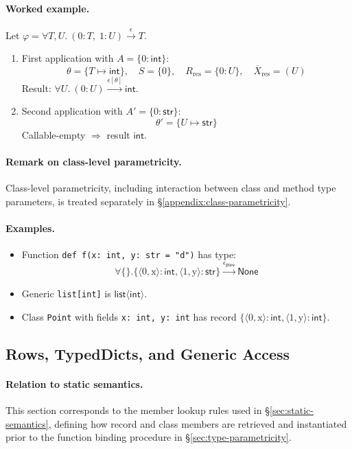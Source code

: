 \paragraph{Worked example.}
Let $\varphi = \forall T,U.~(0:T,\;1:U) \xrightarrow{\epsilon} T$.
\begin{enumerate}
  \item First application with $A=\{0:\mathsf{int}\}$:
  \[
    \theta=\{T\mapsto \mathsf{int}\},\quad S=\{0\},\quad
    R_{\mathrm{res}} = \{0:U\},\quad
    \overline{X}_{\mathrm{res}}=(U)
  \]
  Result: $\forall U.~(0:U)\xrightarrow{\epsilon[\theta]} \mathsf{int}$.
  \item Second application with $A'=\{0:\mathsf{str}\}$:
  \[
    \theta'=\{U\mapsto \mathsf{str}\}
  \]
  Callable-empty $\Rightarrow$ result $\mathsf{int}$.
\end{enumerate}

\paragraph{Remark on class-level parametricity.}
Class-level parametricity, including interaction between class and method type parameters,
is treated separately in \S\ref{appendix:class-parametricity}.


\paragraph{Examples.}  
\begin{itemize}
\item Function \texttt{def f(x: int, y: str = "d")} has type:
 \[\forall \{\}.\{\langle 0, \text{x} \rangle : \mathsf{int}, \langle 1, \text{y} \rangle : \mathsf{str}\} \xrightarrow{\epsilon_\mathsf{pure}} \mathsf{None}\]
\item Generic \texttt{list[int]} is $\mathsf{list}\langle\mathsf{int}\rangle$.
\item Class \texttt{Point} with fields \texttt{x: int, y: int} has record $\{\langle 0, \text{x} \rangle : \mathsf{int}, \langle 1, \text{y} \rangle : \mathsf{int}\}$.
\end{itemize}


\subsection{Rows, TypedDicts, and Generic Access}
\label{sec:rows-generic-access}

\paragraph{Relation to static semantics.}
This section corresponds to the member lookup rules used in \S\ref{sec:static-semantics}, defining how record and class members are retrieved and instantiated prior to the function binding procedure in \S\ref{sec:type-parametricity}.


